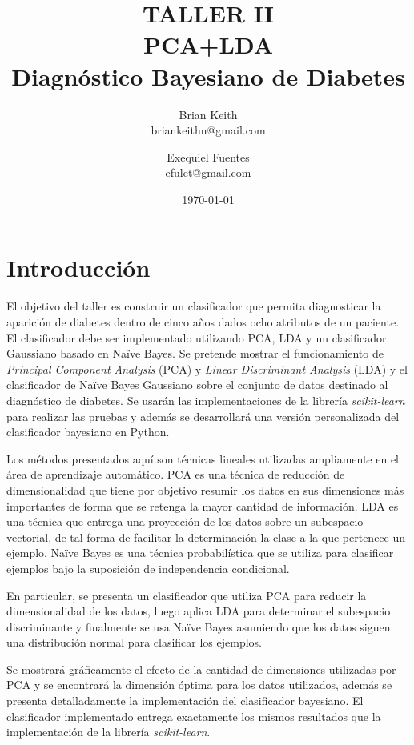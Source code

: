 \documentclass[letter, titlepage, 10pt]{article}
\title{TALLER II \\ PCA+LDA \\ Diagnóstico Bayesiano de Diabetes} %
\author{Brian Keith\\
  \small briankeithn@gmail.com\\
\and
  Exequiel Fuentes\\
  \small efulet@gmail.com\\
}
\date{\today}
\begin{document}
\maketitle %



\section{Introducción}
El objetivo del taller es construir un clasificador que permita diagnosticar la aparición de diabetes dentro de cinco años dados ocho atributos de un paciente. El clasificador debe ser implementado utilizando PCA, LDA y un clasificador Gaussiano basado en Naïve Bayes. Se pretende mostrar el funcionamiento de \textit{Principal Component Analysis} (PCA) y \textit{Linear Discriminant Analysis} (LDA) y el clasificador de Naïve Bayes Gaussiano sobre el conjunto de datos destinado al diagnóstico de diabetes. Se usarán las implementaciones de la librería \textit{scikit-learn} para realizar las pruebas y además se desarrollará una versión personalizada del clasificador bayesiano en Python.

Los métodos presentados aquí son técnicas lineales utilizadas ampliamente en el área de aprendizaje automático. PCA es una técnica de reducción de dimensionalidad que tiene por objetivo resumir los datos en sus dimensiones más importantes de forma que se retenga la mayor cantidad de información. LDA es una técnica que entrega una proyección de los datos sobre un subespacio vectorial, de tal forma de facilitar la determinación la clase a la que pertenece un ejemplo. Naïve Bayes es una técnica probabilística que se utiliza para clasificar ejemplos bajo la suposición de independencia condicional.

En particular, se presenta un clasificador que utiliza PCA para reducir la dimensionalidad de los datos, luego aplica LDA para determinar el subespacio discriminante y finalmente se usa Naïve Bayes asumiendo que los datos siguen una distribución normal para clasificar los ejemplos.

Se mostrará gráficamente el efecto de la cantidad de dimensiones utilizadas por PCA y se encontrará la dimensión óptima para los datos utilizados, además se presenta detalladamente la implementación del clasificador bayesiano. El clasificador implementado entrega exactamente los mismos resultados que la implementación de la librería \textit{scikit-learn}.
\end{document}
